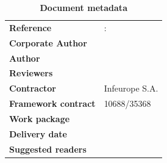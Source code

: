 \clearpage


\setlength{\headheight}{1cm}
\setlength{\footskip}{18mm}
\addtolength{\textheight}{-\footskip}
\pagestyle{empty}

\clearpage



\vspace*{\fill}  

\textbf{\footnotesize \DelPreparation}

\begin{flushleft}
\begin{table}[!b]
	 \caption*{\large\textbf{Document metadata}}
	 \footnotesize
	  \begin{tabular}{p{3.6cm}p{\textwidth-5cm}}
		\textbf{Reference} 	&   \DelNumber: \DelTitle \\	
		\textbf{Corporate Author}      &   \DelCorporateAuthor \\
		\textbf{Author}             &   \DelAuthor \\
		\textbf{Reviewers}          &   \DelReviewer \\
		\textbf{Contractor}    &   Infeurope S.A. \\
		\textbf{Framework contract}    &   10688/35368 \\	
		\textbf{Work package}  &   \DelNumber\\    				
		\textbf{Delivery date}  &   \DelDate \\    
		\textbf{Suggested readers}    	&   \DelReaders \\
	\end{tabular}
\end{table}
\end{flushleft}



